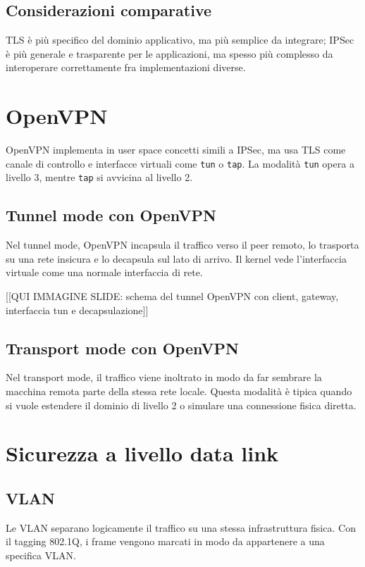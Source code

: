 \documentclass[12pt, a4paper]{report}
\begin{document}
\subsection{Considerazioni comparative}
TLS \`e pi\`u specifico del dominio applicativo, ma pi\`u semplice da integrare; IPSec \`e pi\`u generale e trasparente per le applicazioni, ma spesso pi\`u complesso da interoperare correttamente fra implementazioni diverse.

\section{OpenVPN}
OpenVPN implementa in user space concetti simili a IPSec, ma usa TLS come canale di controllo e interfacce virtuali come \texttt{tun} o \texttt{tap}. La modalit\`a \texttt{tun} opera a livello 3, mentre \texttt{tap} si avvicina al livello 2.

\subsection{Tunnel mode con OpenVPN}
Nel tunnel mode, OpenVPN incapsula il traffico verso il peer remoto, lo trasporta su una rete insicura e lo decapsula sul lato di arrivo. Il kernel vede l'interfaccia virtuale come una normale interfaccia di rete.

[[QUI IMMAGINE SLIDE: schema del tunnel OpenVPN con client, gateway, interfaccia tun e decapsulazione]]

\subsection{Transport mode con OpenVPN}
Nel transport mode, il traffico viene inoltrato in modo da far sembrare la macchina remota parte della stessa rete locale. Questa modalit\`a \`e tipica quando si vuole estendere il dominio di livello 2 o simulare una connessione fisica diretta.

\section{Sicurezza a livello data link}

\subsection{VLAN}
Le VLAN separano logicamente il traffico su una stessa infrastruttura fisica. Con il tagging 802.1Q, i frame vengono marcati in modo da appartenere a una specifica VLAN.
\end{document}
